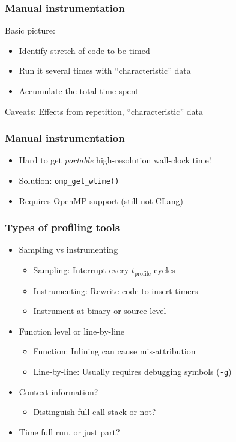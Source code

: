 \documentclass{beamer}
\begin{document}
\begin{frame}
  \frametitle{Manual instrumentation}

  Basic picture:
  \begin{itemize}
  \item Identify stretch of code to be timed
  \item Run it several times with ``characteristic'' data
  \item Accumulate the total time spent
  \end{itemize}
  Caveats: Effects from repetition, ``characteristic'' data
\end{frame}


\begin{frame}
  \frametitle{Manual instrumentation}

  \begin{itemize}
  \item Hard to get {\em portable} high-resolution wall-clock time!
  \item Solution: {\tt omp\_get\_wtime()}
  \item Requires OpenMP support (still not CLang)
  \end{itemize}
\end{frame}


\begin{frame}
  \frametitle{Types of profiling tools}

  \begin{itemize}
  \item Sampling vs instrumenting
    \begin{itemize}
    \item Sampling: Interrupt every $t_{\mathrm{profile}}$ cycles
    \item Instrumenting: Rewrite code to insert timers
    \item Instrument at binary or source level
    \end{itemize}
  \item Function level or line-by-line
    \begin{itemize}
    \item Function: Inlining can cause mis-attribution
    \item Line-by-line: Usually requires debugging symbols ({\tt -g})
    \end{itemize}
  \item Context information?
    \begin{itemize}
    \item Distinguish full call stack or not?
    \end{itemize}
  \item Time full run, or just part?
  \end{itemize}
\end{frame}
\end{document}

